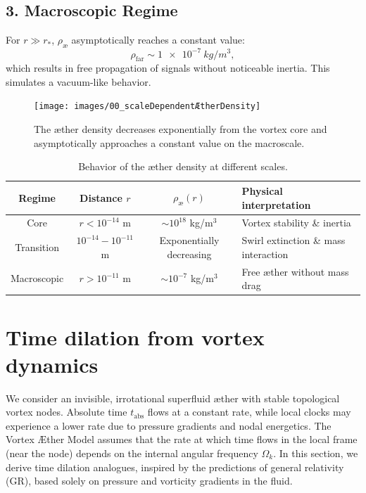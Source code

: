 \subsection*{3. Macroscopic Regime}

For \( r \gg r_* \), \( \rho_\text{\ae} \) asymptotically reaches a constant value:
\begin{equation}
    \rho_\text{far} \sim \SI{1e-7}{kg/m^3},
\end{equation}
which results in free propagation of signals without noticeable inertia. This simulates a vacuum-like behavior.

\begin{figure}[htbp]
    \centering
    \texttt{[image: images/00\_scaleDependentÆtherDensity]}
    \caption{The æther density decreases exponentially from the vortex core and asymptotically approaches a constant value on the macroscale.}
    \label{fig:vortexfields2}
\end{figure}

\begin{table}[h!]
    \centering
    \begin{tabular}{|c|c|c|l|}
        \hline
        Regime & Distance $r$ & $\rho_\text{\ae}(r)$ & Physical interpretation \\
        \hline
        Core & $r < 10^{-14}$ m & $\sim 10^{18}$ kg/m$^3$ & Vortex stability \& inertia \\
        Transition & $10^{-14} - 10^{-11}$ m & Exponentially decreasing & Swirl extinction \& mass interaction \\
        Macroscopic & $r > 10^{-11}$ m & $\sim 10^{-7}$ kg/m$^3$ & Free æther without mass drag \\
        \hline
    \end{tabular}
    \caption{Behavior of the æther density at different scales.}
\end{table}


\section{Time dilation from vortex dynamics}

We consider an invisible, irrotational superfluid æther with stable topological vortex nodes. Absolute time $t_\text{abs}$ flows at a constant rate, while local clocks may experience a lower rate due to pressure gradients and nodal energetics. The Vortex Æther Model assumes that the rate at which time flows in the local frame (near the node) depends on the internal angular frequency $\Omega_k$. In this section, we derive time dilation analogues, inspired by the predictions of general relativity (GR), based solely on pressure and vorticity gradients in the fluid.

